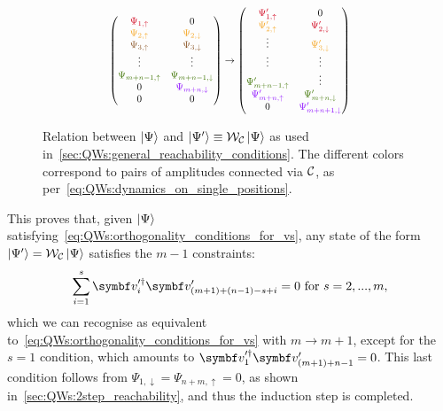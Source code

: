 \begin{figure}[tb]
    \centering
    \begin{equation}\scalebox{0.8}{$
    \begin{pmatrix}
    \textcolor[rgb]{0.82,0.01,0.11}{\Psi_{1,\uparrow}} & 0 \\
    \textcolor[rgb]{0.96,0.65,0.14}{\Psi_{2,\uparrow}} &
    \textcolor[rgb]{0.96,0.65,0.14}{\Psi_{2,\downarrow}} \\
    \textcolor[rgb]{0.55,0.34,0.16}{\Psi_{3,\uparrow}} &
    \textcolor[rgb]{0.55,0.34,0.16}{\Psi_{3,\downarrow}} \\
    \vdots  & \vdots \\
    \textcolor[rgb]{0.25,0.46,0.02}{\Psi_{m+n-1,\uparrow}} &
    \textcolor[rgb]{0.25,0.46,0.02}{\Psi_{m+n-1,\downarrow}} \\
    0 & \textcolor[rgb]{0.56,0.07,1}{\Psi_{m+n,\downarrow}} \\
    0 & 0
    \end{pmatrix}
    \rightarrow
    \begin{pmatrix}
    \textcolor[rgb]{0.82,0.01,0.11}{\Psi'_{1,\uparrow}} & 0 \\
    \textcolor[rgb]{0.96,0.65,0.14}{\Psi'_{2,\uparrow}} &
    \textcolor[rgb]{0.82,0.01,0.11}{\Psi'_{2,\downarrow}} \\
    \vdots &
    \textcolor[rgb]{0.96,0.65,0.14}{\Psi'_{3,\downarrow}} \\
    \vdots & \vdots \\
    \textcolor[rgb]{0.25,0.46,0.02}{\Psi'_{m+n-1,\uparrow}} & \vdots \\
    \textcolor[rgb]{0.56,0.07,1}{\Psi'_{m+n,\uparrow}} &
    \textcolor[rgb]{0.25,0.46,0.02}{\Psi'_{m+n,\downarrow}}\\
    0 & \textcolor[rgb]{0.56,0.07,1}{\Psi'_{m+n+1,\downarrow}}
    \end{pmatrix}$}
    \end{equation}
    \caption{
        Relation between $\ket\Psi$ and $\ket{\Psi'}\equiv{\mathcal{W}}_{\mathcal{C}}\ket\Psi$ as used in~\cref{sec:QWs:general_reachability_conditions}. The different colors correspond to pairs of amplitudes connected via ${\mathcal{C}}$, as per~\cref{eq:QWs:dynamics_on_single_positions}.
    }
    \label{fig:QWs:visualisation_PsiVsPsip}
\end{figure}

This proves that, given $\ket\Psi$ satisfying~\cref{eq:QWs:orthogonality_conditions_for_vs}, any state of the form $\ket{\Psi'}={\mathcal{W}}_{\mathcal{C}}\ket\Psi$ satisfies the $m-1$ constraints:
\begin{equation}
    \sum_{i=1}^{s} \bs v^{\prime\dagger}_i \bs v^\prime_{(m+1)+(n-1)-s+i}=0
	\text{ for }
	s = 2,...,m,
	\label{eq:QWs:general_orthogonality_almost_finished}
\end{equation}
which we can recognise as equivalent to~\cref{eq:QWs:orthogonality_conditions_for_vs} with $m\to m+1$, except for the $s=1$ condition, which amounts to $\bs v_1^{\prime\dagger}\bs v'_{(m+1)+n-1}=0$.
This last condition follows from $\Psi_{1,\downarrow}=\Psi_{n+m,\uparrow}=0$, as shown in~\cref{sec:QWs:2step_reachability}, and thus the induction step is completed.

